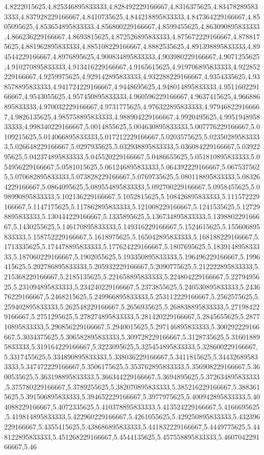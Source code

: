 4.8222015625,4.825346895833333,4.828492229166667,4.8316375625,4.834782895833333,4.837928229166667,4.8410735625,4.844218895833333,4.847364229166667,4.8505095625,4.853654895833333,4.856800229166667,4.8599455625,4.863090895833333,4.866236229166667,4.8693815625,4.872526895833333,4.875672229166667,4.8788175625,4.881962895833333,4.885108229166667,4.8882535625,4.891398895833333,4.894544229166667,4.8976895625,4.900834895833333,4.903980229166667,4.9071255625,4.910270895833333,4.913416229166667,4.9165615625,4.919706895833333,4.922852229166667,4.9259975625,4.929142895833333,4.932288229166667,4.9354335625,4.938578895833333,4.941724229166667,4.9448695625,4.948014895833333,4.951160229166667,4.9543055625,4.957450895833333,4.960596229166667,4.9637415625,4.966886895833333,4.970032229166667,4.9731775625,4.976322895833333,4.979468229166667,4.9826135625,4.985758895833333,4.988904229166667,4.9920495625,4.995194895833333,4.998340229166667,5.0014855625,5.004630895833333,5.007776229166667,5.0109215625,5.014066895833333,5.017212229166667,5.0203575625,5.023502895833333,5.026648229166667,5.0297935625,5.032938895833333,5.036084229166667,5.0392295625,5.042374895833333,5.045520229166667,5.0486655625,5.051810895833333,5.054956229166667,5.0581015625,5.061246895833333,5.064392229166667,5.0675375625,5.070682895833333,5.073828229166667,5.0769735625,5.080118895833333,5.083264229166667,5.0864095625,5.089554895833333,5.092700229166667,5.0958455625,5.098990895833333,5.102136229166667,5.1052815625,5.108426895833333,5.111572229166667,5.1147175625,5.117862895833333,5.121008229166667,5.1241535625,5.127298895833333,5.130444229166667,5.1335895625,5.136734895833333,5.139880229166667,5.1430255625,5.146170895833333,5.149316229166667,5.1524615625,5.155606895833333,5.158752229166667,5.1618975625,5.165042895833333,5.168188229166667,5.1713335625,5.174478895833333,5.177624229166667,5.1807695625,5.183914895833333,5.187060229166667,5.1902055625,5.193350895833333,5.196496229166667,5.1996415625,5.202786895833333,5.205932229166667,5.2090775625,5.212222895833333,5.215368229166667,5.2185135625,5.221658895833333,5.224804229166667,5.2279495625,5.231094895833333,5.234240229166667,5.2373855625,5.240530895833333,5.243676229166667,5.2468215625,5.249966895833333,5.253112229166667,5.2562575625,5.259402895833333,5.262548229166667,5.2656935625,5.268838895833333,5.271984229166667,5.2751295625,5.278274895833333,5.281420229166667,5.2845655625,5.287710895833333,5.290856229166667,5.2940015625,5.297146895833333,5.300292229166667,5.3034375625,5.306582895833333,5.309728229166667,5.3128735625,5.316018895833333,5.319164229166667,5.3223095625,5.325454895833333,5.328600229166667,5.3317455625,5.334890895833333,5.338036229166667,5.3411815625,5.344326895833333,5.347472229166667,5.3506175625,5.353762895833333,5.356908229166667,5.3600535625,5.363198895833333,5.366344229166667,5.3694895625,5.372634895833333,5.375780229166667,5.3789255625,5.382070895833333,5.385216229166667,5.3883615625,5.391506895833333,5.394652229166667,5.3977975625,5.400942895833333,5.404088229166667,5.4072335625,5.410378895833333,5.413524229166667,5.4166695625,5.419814895833333,5.422960229166667,5.4261055625,5.429250895833333,5.432396229166667,5.4355415625,5.438686895833333,5.441832229166667,5.4449775625,5.448122895833333,5.451268229166667,5.4544135625,5.457558895833333,5.460704229166667,5.46